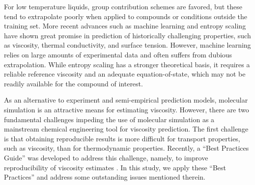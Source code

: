 \documentclass[preprint,review,12pt]{elsarticle}
\begin{document}
    For low temperature liquids, group contribution schemes are favored, but these tend to extrapolate poorly when applied to compounds or conditions outside the training set. More recent advances such as machine learning \cite{Mulero2017,Lee2017} and entropy scaling \cite{Lotgering2015} have shown great promise in prediction of historically challenging properties, such as viscosity, thermal conductivity, and surface tension. However, machine learning relies on large amounts of experimental data and often suffers from dubious extrapolation. While entropy scaling has a stronger theoretical basis, it requires a reliable reference viscosity and an adequate equation-of-state, which may not be readily available for the compound of interest.
	
	
	
	
	
	
	
	As an alternative to experiment and semi-empirical prediction models, molecular simulation is an attractive means for estimating viscosity. However, there are two fundamental challenges impeding the use of molecular simulation as a mainstream chemical engineering tool for viscosity prediction. The first challenge is that obtaining reproducible results is more difficult for transport properties, such as viscosity, than for thermodynamic properties. Recently, a ``Best Practices Guide'' was developed to address this challenge, namely, to improve reproducibility of viscosity estimates \cite{Maginn2018}. In this study, we apply these ``Best Practices'' and address some outstanding issues mentioned therein.
	
\end{document}
